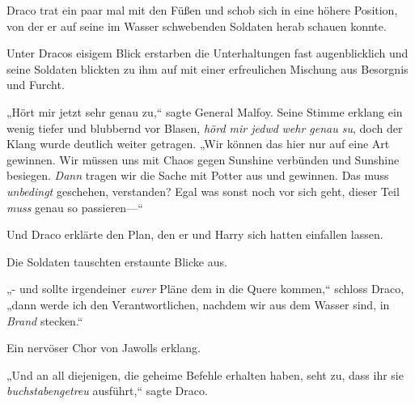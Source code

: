 Draco trat ein paar mal mit den Füßen und schob sich in eine höhere Position, von der er auf seine im Wasser schwebenden Soldaten herab schauen konnte.

Unter Dracos eisigem Blick erstarben die Unterhaltungen fast augenblicklich und seine Soldaten blickten zu ihm auf mit einer erfreulichen Mischung aus Besorgnis und Furcht.

„Hört mir jetzt sehr genau zu,“ sagte General Malfoy. Seine Stimme erklang ein wenig tiefer und blubbernd vor Blasen, \emph{hörd mir jedwd} \emph{wehr genau su}, doch der Klang wurde deutlich weiter getragen. „Wir können das hier nur auf eine Art gewinnen. Wir müssen uns mit Chaos gegen Sunshine verbünden und Sunshine besiegen. \emph{Dann} tragen wir die Sache mit Potter aus und gewinnen. Das muss \emph{unbedingt} geschehen, verstanden? Egal was sonst noch vor sich geht, dieser Teil \emph{muss} genau so passieren—“

Und Draco erklärte den Plan, den er und Harry sich hatten einfallen lassen.

Die Soldaten tauschten erstaunte Blicke aus.

„- und sollte irgendeiner \emph{eurer} Pläne dem in die Quere kommen,“ schloss Draco, „dann werde ich den Verantwortlichen, nachdem wir aus dem Wasser sind, in \emph{Brand} stecken.“

Ein nervöser Chor von Jawolls erklang.

„Und an all diejenigen, die geheime Befehle erhalten haben, seht zu, dass ihr sie \emph{buchstabengetreu} ausführt,“ sagte Draco.


